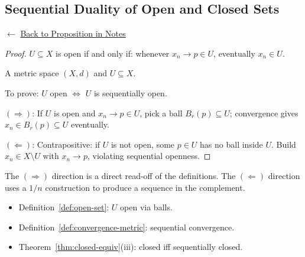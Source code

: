 
\subsection*{Sequential Duality of Open and Closed Sets}
\label{prf:sequential-duality}

\begin{remark*}[Return]
$\leftarrow$ \hyperref[prop:sequential-duality]{Back to Proposition in Notes}
\end{remark*}

\begin{proof}
\Claim $U \subseteq X$ is open if and only if:
whenever $x_n \to p \in U$, eventually $x_n \in U$.

\Given A metric space $(X,d)$ and $U \subseteq X$.

\Goal To prove: $U$ open $\iff$ $U$ is sequentially open.

\Strategy
$(\Rightarrow)$: If $U$ is open and $x_n \to p \in U$, pick a ball
$B_r(p) \subseteq U$; convergence gives $x_n \in B_r(p) \subseteq U$ eventually.

$(\Leftarrow)$: Contrapositive: if $U$ is not open, some $p \in U$ has
no ball inside $U$. Build $x_n \in X \setminus U$ with $x_n \to p$,
violating sequential openness.


\end{proof}

\begin{remark*}
The $(\Rightarrow)$ direction is a direct read-off of the definitions.
The $(\Leftarrow)$ direction uses a $1/n$ construction to produce
a sequence in the complement.
\end{remark*}

\begin{remark*}[Dependencies]
\begin{itemize}
  \item Definition~\ref{def:open-set}: $U$ open via balls.
  \item Definition~\ref{def:convergence-metric}: sequential convergence.
  \item Theorem~\ref{thm:closed-equiv}(iii): closed iff sequentially closed.
\end{itemize}
\end{remark*}
